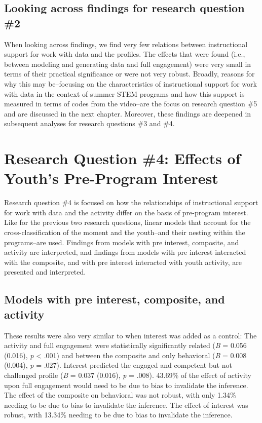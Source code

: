 \documentclass[]{book}
\theoremstyle{definition}
\theoremstyle{definition}
\theoremstyle{definition}
\theoremstyle{remark}
\begin{document}
\subsection{Looking across findings for research question
\#2}\label{looking-across-findings-for-research-question-2}

When looking across findings, we find very few relations between
instructional support for work with data and the profiles. The effects
that were found (i.e., between modeling and generating data and full
engagement) were very small in terms of their practical significance or
were not very robust. Broadly, reasons for why this may be--focusing on
the characteristics of instructional support for work with data in the
context of summer STEM programs and how this support is measured in
terms of codes from the video--are the focus on research question \#5
and are discussed in the next chapter. Moreover, these findings are
deepened in subsequent analyses for research questions \#3 and \#4.

\section{Research Question \#4: Effects of Youth's Pre-Program
Interest}\label{research-question-4-effects-of-youths-pre-program-interest}

Research question \#4 is focused on how the relationships of
instructional support for work with data and the activity differ on the
basis of pre-program interest. Like for the previous two research
questions, linear models that account for the cross-classification of
the moment and the youth--and their nesting within the programs--are
used. Findings from models with pre interest, composite, and activity
are interpreted, and findings from models with pre interest interacted
with the composite, and with pre interest interacted with youth
activity, are presented and interpreted.

\subsection{Models with pre interest, composite, and
activity}\label{models-with-pre-interest-composite-and-activity}

These results were also very similar to when interest was added as a
control: The activity and full engagement were statistically
significantly related (\emph{B} = 0.056 (0.016), \emph{p} \textless{}
.001) and between the composite and only behavioral (\emph{B} = 0.008
(0.004), \emph{p} = .027). Interest predicted the engaged and competent
but not challenged profile (\emph{B} = 0.037 (0.016), \emph{p} = .008).
43.69\% of the effect of activity upon full engagement would need to be
due to bias to invalidate the inference. The effect of the composite on
behavioral was not robust, with only 1.34\% needing to be due to bias to
invalidate the inference. The effect of interest was robust, with
13.34\% needing to be due to bias to invalidate the inference.
\end{document}
